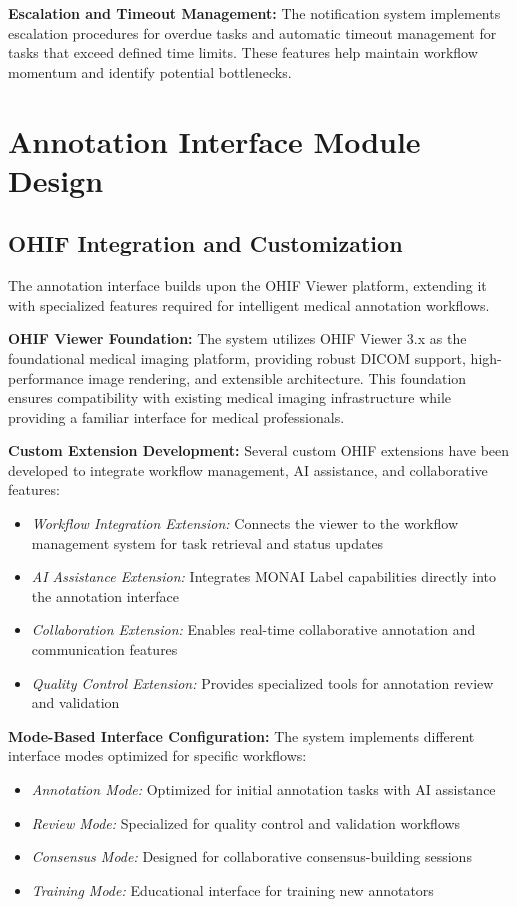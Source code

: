 \textbf{Escalation and Timeout Management:} The notification system implements escalation procedures for overdue tasks and automatic timeout management for tasks that exceed defined time limits. These features help maintain workflow momentum and identify potential bottlenecks.

\section{Annotation Interface Module Design}

\subsection{OHIF Integration and Customization}

The annotation interface builds upon the OHIF Viewer platform, extending it with specialized features required for intelligent medical annotation workflows.

\textbf{OHIF Viewer Foundation:} The system utilizes OHIF Viewer 3.x as the foundational medical imaging platform, providing robust DICOM support, high-performance image rendering, and extensible architecture. This foundation ensures compatibility with existing medical imaging infrastructure while providing a familiar interface for medical professionals.

\textbf{Custom Extension Development:} Several custom OHIF extensions have been developed to integrate workflow management, AI assistance, and collaborative features:

\begin{itemize}
    \item \textit{Workflow Integration Extension:} Connects the viewer to the workflow management system for task retrieval and status updates
    \item \textit{AI Assistance Extension:} Integrates MONAI Label capabilities directly into the annotation interface
    \item \textit{Collaboration Extension:} Enables real-time collaborative annotation and communication features
    \item \textit{Quality Control Extension:} Provides specialized tools for annotation review and validation
\end{itemize}

\textbf{Mode-Based Interface Configuration:} The system implements different interface modes optimized for specific workflows:

\begin{itemize}
    \item \textit{Annotation Mode:} Optimized for initial annotation tasks with AI assistance
    \item \textit{Review Mode:} Specialized for quality control and validation workflows
    \item \textit{Consensus Mode:} Designed for collaborative consensus-building sessions
    \item \textit{Training Mode:} Educational interface for training new annotators
\end{itemize}


